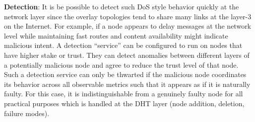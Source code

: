 \textbf{Detection}: It is be possible to detect such DoS style behavior quickly at the network layer since the overlay topologies tend to share many links at the layer-3 on the Internet. For example, if a node appears to delay messages at the network level while maintaining fast routes and content availability might indicate malicious intent. A detection “service” can be configured to run on nodes that have higher stake or trust. They can detect anomalies between different layers of a potentially malicious node and agree to reduce the trust level of that node. Such a detection service can only be thwarted if the malicious node coordinates its behavior across all observable metrics such that it appears as if it is naturally faulty. For this case, it is indistinguishable from a genuinely faulty node for all practical purposes which is handled at the DHT layer (node addition, deletion, failure modes).

